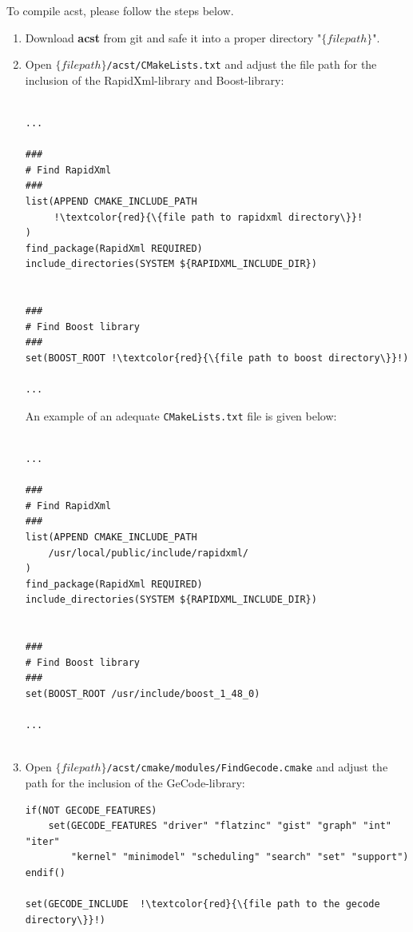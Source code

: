 To compile acst, please follow the steps below.
\begin{enumerate}
	\item Download {\bf acst} from git and safe it into a proper directory "$\{file path\}$".
	\item Open {\tt $\{file path\}$/acst/CMakeLists.txt} and adjust the file path for the inclusion of the RapidXml-library and Boost-library:
	
\begin{lstlisting}[basicstyle=\ttfamily\scriptsize,backgroundcolor={\color{gray!30}}, escapechar=!]

...

###
# Find RapidXml
###
list(APPEND CMAKE_INCLUDE_PATH
	 !\textcolor{red}{\{file path to rapidxml directory\}}!
)
find_package(RapidXml REQUIRED)
include_directories(SYSTEM ${RAPIDXML_INCLUDE_DIR})


###
# Find Boost library 
###
set(BOOST_ROOT !\textcolor{red}{\{file path to boost directory\}}!) 

...

\end{lstlisting}
An example of an adequate {\tt CMakeLists.txt} file is given below:

\begin{lstlisting}[basicstyle=\ttfamily\scriptsize,backgroundcolor={\color{gray!30}}, escapechar=!]
	
...
	
###
# Find RapidXml
###
list(APPEND CMAKE_INCLUDE_PATH
	/usr/local/public/include/rapidxml/ 
)
find_package(RapidXml REQUIRED)
include_directories(SYSTEM ${RAPIDXML_INCLUDE_DIR})
	
	
###
# Find Boost library 
###
set(BOOST_ROOT /usr/include/boost_1_48_0) 
	
...
	
\end{lstlisting}
	
	\item Open {\tt $\{file path\}$/acst/cmake/modules/FindGecode.cmake} and adjust the path for the inclusion of the GeCode-library:
	
\begin{lstlisting}[basicstyle=\ttfamily\scriptsize,backgroundcolor={\color{gray!30}}, escapechar=!]
if(NOT GECODE_FEATURES)
	set(GECODE_FEATURES "driver" "flatzinc" "gist" "graph" "int" "iter"  
		"kernel" "minimodel" "scheduling" "search" "set" "support")
endif()

set(GECODE_INCLUDE  !\textcolor{red}{\{file path to the gecode directory\}}!)


\end{lstlisting}
\end{enumerate}
